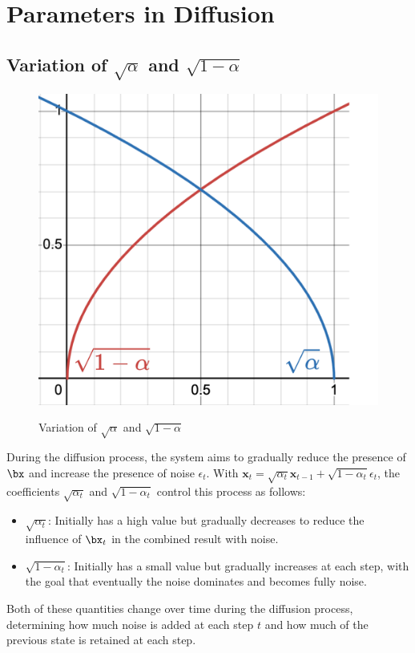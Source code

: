

\section{Parameters in Diffusion}
\label{appendix:Appendix1}

\subsection{Variation of $\sqrt{\alpha}$ and $\sqrt{1 - \alpha}$}

\begin{figure}[h]
	\includegraphics[width=0.5\linewidth]{images/SquareAlpha}
	\label{fig:wrapfig}
	\caption{Variation of $\sqrt{\alpha}$ and $\sqrt{1 - \alpha}$}
\end{figure}

During the diffusion process, the system aims to gradually reduce the presence of $\bx$ and increase the presence of noise $\epsilon_t$. With $\mathbf{x}_{t} = \sqrt{\alpha_t} \mathbf{x}_{t-1} + \sqrt{1 - \alpha_t} \epsilon_t$, the coefficients $\sqrt{\alpha_t}$ and $\sqrt{1 - \alpha_t}$ control this process as follows:

\begin{itemize}
	\item $\sqrt{\alpha_t}$: Initially has a high value but gradually decreases to reduce the influence of $\bx_t$ in the combined result with noise.
	\item $\sqrt{1 - \alpha_t}$: Initially has a small value but gradually increases at each step, with the goal that eventually the noise dominates and becomes fully noise.
\end{itemize}

Both of these quantities change over time during the diffusion process, determining how much noise is added at each step $t$ and how much of the previous state is retained at each step.

